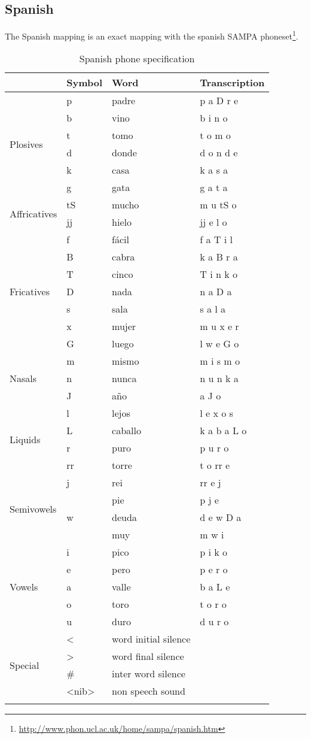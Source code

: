 \subsection{Spanish}
\label{sec:phspanish}
The Spanish mapping is an exact mapping with the spanish SAMPA
phoneset\footnote{\url{http://www.phon.ucl.ac.uk/home/sampa/spanish.htm}}.

\begin{longtable}{l|l|l|l}
	& Symbol & Word & Transcription\\
	\hline
	\multirow{6}{*}{Plosives} &
	p & padre & p a D r e\\
  & b & vino & b i n o\\
  & t & tomo & t o m o\\
  & d & donde & d o n d e\\
  & k & casa & k a s a\\
  & g & gata & g a t a\\
	\hline
	\multirow{2}{*}{Affricatives} &
	tS & mucho & m u tS o\\
	& jj & hielo & jj e l o\\
	\hline
	\multirow{7}{*}{Fricatives} &
	f & fácil & f a T i l\\
	& B & cabra & k a B r a\\
	& T & cinco & T i n k o\\
	& D & nada & n a D a\\
	& s & sala & s a l a \\
	& x & mujer & m u x e r\\
	& G & luego & l w e G o\\
	\hline
	\multirow{3}{*}{Nasals} &
	m & mismo & m i s m o\\
	& n & nunca & n u n k a\\
	& J & año & a J o\\
	\hline
	\multirow{4}{*}{Liquids} & 
	l & lejos & l e x o s\\
	& L & caballo & k a b a L o\\
	& r & puro & p u r o\\
	& rr & torre & t o rr e\\
	\hline
	\multirow{4}{*}{Semivowels} &
	j & rei & rr e j\\
	&  & pie & p j e\\
	& w & deuda & d e w D a\\
	&  & muy & m w i\\
	\hline
	\multirow{5}{*}{Vowels} &
	i & pico & p i k o\\
	& e & pero & p e r o\\
	& a & valle & b a L e\\
	& o & toro & t o r o\\
	& u & duro & d u r o\\
	\hline
	\multirow{4}{*}{Special} &
	\textless  & word initial silence & \\
	& \textgreater  & word final silence & \\
	& \# & inter word silence & \\
	& \textless nib\textgreater  & non speech sound & \\
	\hline
	\caption{Spanish phone specification}
\end{longtable}

